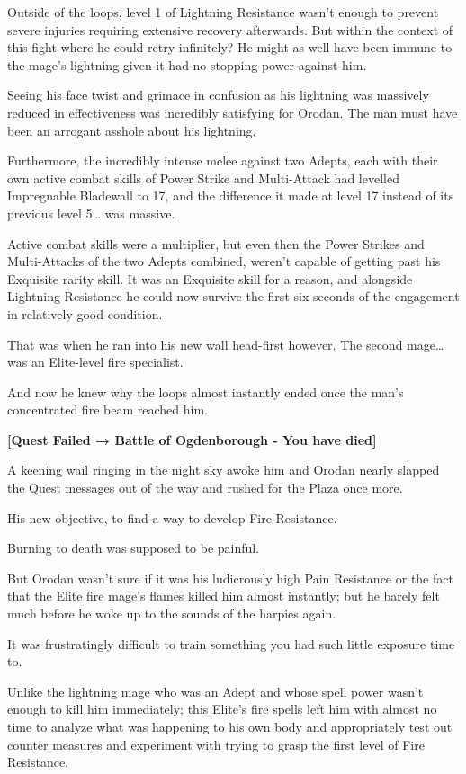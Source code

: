 \documentclass[a4paper,10pt]{book}
\begin{document}
Outside of the loops, level 1 of Lightning Resistance wasn’t enough to prevent severe injuries requiring extensive recovery afterwards. But within the context of this fight where he could retry infinitely? He might as well have been immune to the mage’s lightning given it had no stopping power against him.\par
Seeing his face twist and grimace in confusion as his lightning was massively reduced in effectiveness was incredibly satisfying for Orodan. The man must have been an arrogant asshole about his lightning.\par
Furthermore, the incredibly intense melee against two Adepts, each with their own active combat skills of Power Strike and Multi-Attack had levelled Impregnable Bladewall to 17, and the difference it made at level 17 instead of its previous level 5… was massive.\par
Active combat skills were a multiplier, but even then the Power Strikes and Multi-Attacks of the two Adepts combined, weren’t capable of getting past his Exquisite rarity skill. It was an Exquisite skill for a reason, and alongside Lightning Resistance he could now survive the first six seconds of the engagement in relatively good condition.\par
That was when he ran into his new wall head-first however. The second mage… was an Elite-level fire specialist.\par
And now he knew why the loops almost instantly ended once the man’s concentrated fire beam reached him.\par
\textbf{[Quest Failed → Battle of Ogdenborough - You have died]}\par
A keening wail ringing in the night sky awoke him and Orodan nearly slapped the Quest messages out of the way and rushed for the Plaza once more.\par
His new objective, to find a way to develop Fire Resistance.\par
\par
Burning to death was supposed to be painful.\par
But Orodan wasn’t sure if it was his ludicrously high Pain Resistance or the fact that the Elite fire mage’s flames killed him almost instantly; but he barely felt much before he woke up to the sounds of the harpies again.\par
It was frustratingly difficult to train something you had such little exposure time to.\par
Unlike the lightning mage who was an Adept and whose spell power wasn’t enough to kill him immediately; this Elite’s fire spells left him with almost no time to analyze what was happening to his own body and appropriately test out counter measures and experiment with trying to grasp the first level of Fire Resistance.\par
\end{document}
